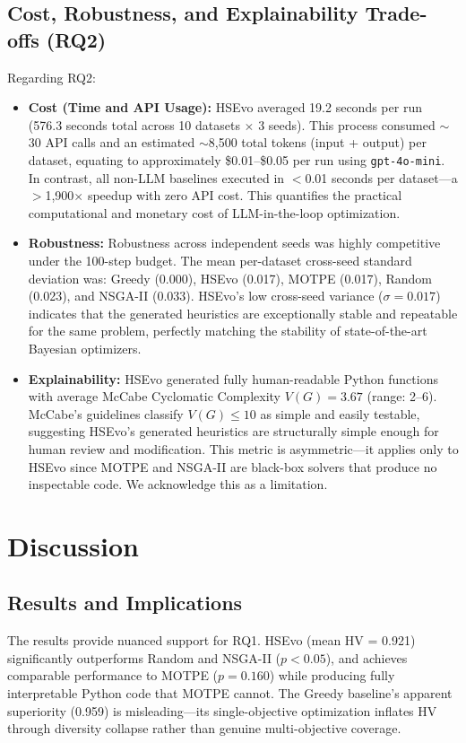 \documentclass[sigconf,nonacm]{acmart}
\begin{document}
\subsection{Cost, Robustness, and Explainability Trade-offs (RQ2)}
Regarding RQ2:
\begin{itemize}
\item \textbf{Cost (Time and API Usage):} HSEvo averaged 19.2 seconds per run (576.3 seconds total across 10 datasets $\times$ 3 seeds). This process consumed $\sim$30 API calls and an estimated $\sim$8,500 total tokens (input + output) per dataset, equating to approximately \$0.01--\$0.05 per run using \texttt{gpt-4o-mini}. In contrast, all non-LLM baselines executed in $<$0.01 seconds per dataset---a $>$1,900$\times$ speedup with zero API cost. This quantifies the practical computational and monetary cost of LLM-in-the-loop optimization.
\item \textbf{Robustness:} Robustness across independent seeds was highly competitive under the 100-step budget. The mean per-dataset cross-seed standard deviation was: Greedy (0.000), HSEvo (0.017), MOTPE (0.017), Random (0.023), and NSGA-II (0.033). HSEvo's low cross-seed variance ($\sigma=0.017$) indicates that the generated heuristics are exceptionally stable and repeatable for the same problem, perfectly matching the stability of state-of-the-art Bayesian optimizers.
\item \textbf{Explainability:} HSEvo generated fully human-readable Python functions with average McCabe Cyclomatic Complexity $V(G) = 3.67$ (range: 2--6). McCabe's guidelines classify $V(G) \leq 10$ as simple and easily testable, suggesting HSEvo's generated heuristics are structurally simple enough for human review and modification. This metric is asymmetric---it applies only to HSEvo since MOTPE and NSGA-II are black-box solvers that produce no inspectable code. We acknowledge this as a limitation.
\end{itemize}

\section{Discussion}

\subsection{Results and Implications}
The results provide nuanced support for RQ1. HSEvo (mean HV = 0.921) significantly outperforms Random and NSGA-II ($p<0.05$), and achieves comparable performance to MOTPE ($p=0.160$) while producing fully interpretable Python code that MOTPE cannot. The Greedy baseline's apparent superiority (0.959) is misleading---its single-objective optimization inflates HV through diversity collapse rather than genuine multi-objective coverage.
\end{document}
